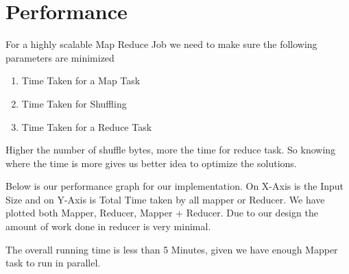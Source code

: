 \section{Performance}

For a highly scalable Map Reduce Job we need to make sure the following parameters are minimized
	\begin{enumerate}
	\item Time Taken for a  Map Task
	\item Time Taken for Shuffling
	\item Time Taken for a Reduce Task
	\end{enumerate}
	
	Higher the number of shuffle bytes, more the time for reduce task. So knowing where the time is more gives us better idea to optimize the solutions.	
	
	Below is our performance graph for our implementation. On X-Axis is the Input Size and on Y-Axis is Total Time taken by all mapper or Reducer. We have plotted both Mapper, Reducer, Mapper + Reducer. Due to our design the amount of work done in reducer is very minimal. 
	
	The overall running time is less than 5 Minutes, given we have enough Mapper task to run in parallel. 
	
    
